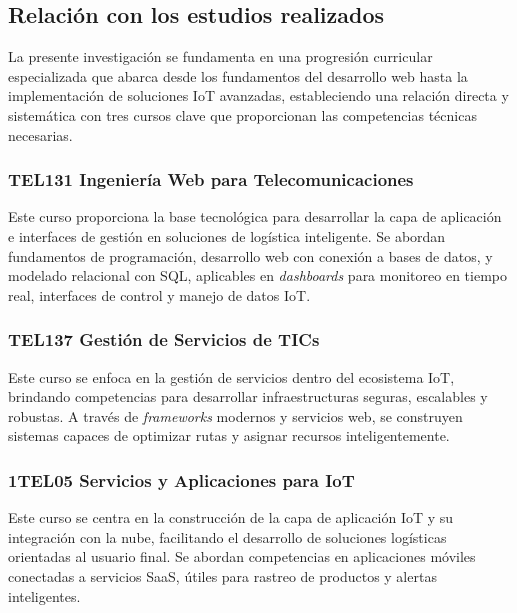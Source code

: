\subsection{Relación con los estudios realizados}

La presente investigación se fundamenta en una progresión curricular especializada que abarca desde los fundamentos del desarrollo web hasta la implementación de soluciones IoT avanzadas, estableciendo una relación directa y sistemática con tres cursos clave que proporcionan las competencias técnicas necesarias.

\subsubsection{TEL131 Ingeniería Web para Telecomunicaciones}

Este curso proporciona la base tecnológica para desarrollar la capa de aplicación e interfaces de gestión en soluciones de logística inteligente. Se abordan fundamentos de programación, desarrollo web con conexión a bases de datos, y modelado relacional con SQL, aplicables en \textit{dashboards} para monitoreo en tiempo real, interfaces de control y manejo de datos IoT.

\subsubsection{TEL137 Gestión de Servicios de TICs}

Este curso se enfoca en la gestión de servicios dentro del ecosistema IoT, brindando competencias para desarrollar infraestructuras seguras, escalables y robustas. A través de \textit{frameworks} modernos y servicios web, se construyen sistemas capaces de optimizar rutas y asignar recursos inteligentemente.

\subsubsection{1TEL05 Servicios y Aplicaciones para IoT}

Este curso se centra en la construcción de la capa de aplicación IoT y su integración con la nube, facilitando el desarrollo de soluciones logísticas orientadas al usuario final. Se abordan competencias en aplicaciones móviles conectadas a servicios SaaS, útiles para rastreo de productos y alertas inteligentes.

